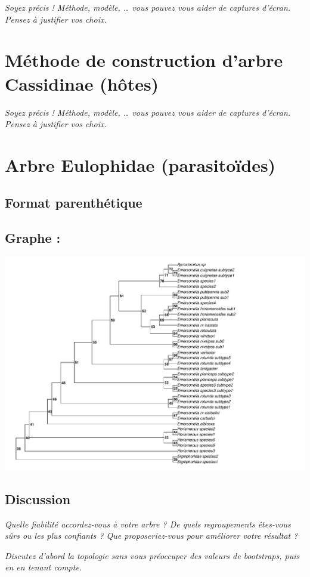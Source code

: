 \documentclass[a4paper, 11pt]{article}
\begin{document}
\textit{Soyez précis ! Méthode, modèle, … vous pouvez vous aider de captures d’écran. Pensez à justifier vos choix.}

\section{Méthode de construction d'arbre Cassidinae (hôtes)}

\emph{Soyez précis ! Méthode, modèle, … vous pouvez vous aider de captures d’écran. Pensez à justifier vos choix.}

\section{Arbre Eulophidae (parasitoïdes)}
\subsection{Format parenthétique} 


\subsection{Graphe :}

\includegraphics[width = 1\textwidth]{plot_Eulo_Cyt_b_PhyML_GTR_modified.pdf}
\subsection{Discussion}
\emph{Quelle fiabilité accordez-vous à votre arbre ? De quels regroupements êtes-vous sûrs ou les plus confiants ? Que proposeriez-vous pour améliorer votre résultat ?}

\emph{Discutez d’abord la topologie sans vous préoccuper des valeurs de bootstraps, puis en en tenant compte.}
\end{document}

